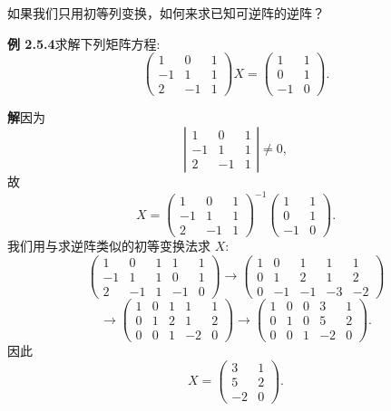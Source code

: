 \documentclass[UTF8,12pt,a4paper,fontset=fandol]{ctexart}
\begin{document}
如果我们只用初等列变换，如何来求已知可逆阵的逆阵？

\noindent\textbf{例 2.5.4}\quad 求解下列矩阵方程:
\[
\left(\begin{array}{rrr}
1 & 0 & 1\\
-1 & 1 & 1\\
2 & -1 & 1
\end{array}\right)X=
\left(\begin{array}{rr}
1 & 1\\
0 & 1\\
-1 & 0
\end{array}\right).
\]

\noindent\textbf{解}\quad 因为
\[
\left|\begin{array}{rrr}
1 & 0 & 1\\
-1 & 1 & 1\\
2 & -1 & 1
\end{array}\right|\ne 0,
\]
故
\[
X=
\left(\begin{array}{rrr}
1 & 0 & 1\\
-1 & 1 & 1\\
2 & -1 & 1
\end{array}\right)^{-1}
\left(\begin{array}{rr}
1 & 1\\
0 & 1\\
-1 & 0
\end{array}\right).
\]
我们用与求逆阵类似的初等变换法求 $X$:
\[
\left(\begin{array}{rrr|rr}
1 & 0 & 1 & 1 & 1\\
-1 & 1 & 1 & 0 & 1\\
2 & -1 & 1 & -1 & 0
\end{array}\right)
\longrightarrow
\left(\begin{array}{rrr|rr}
1 & 0 & 1 & 1 & 1\\
0 & 1 & 2 & 1 & 2\\
0 & -1 & -1 & -3 & -2
\end{array}\right)
\]
\[
\longrightarrow
\left(\begin{array}{rrr|rr}
1 & 0 & 1 & 1 & 1\\
0 & 1 & 2 & 1 & 2\\
0 & 0 & 1 & -2 & 0
\end{array}\right)
\longrightarrow
\left(\begin{array}{rrr|rr}
1 & 0 & 0 & 3 & 1\\
0 & 1 & 0 & 5 & 2\\
0 & 0 & 1 & -2 & 0
\end{array}\right).
\]
因此
\[
X=\left(\begin{array}{rr}
3 & 1\\
5 & 2\\
-2 & 0
\end{array}\right).
\]
\end{document}
